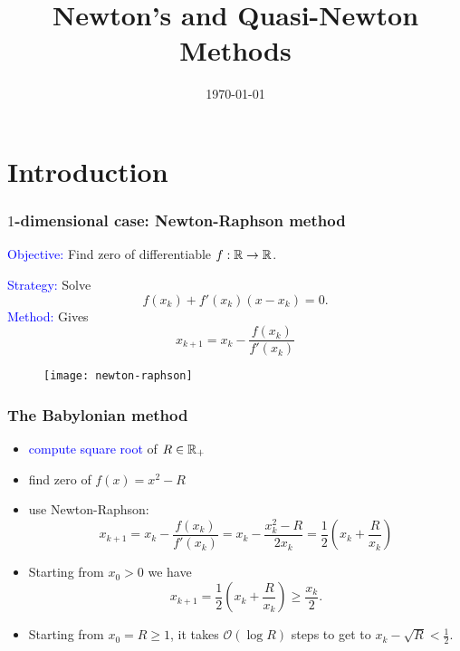 \documentclass{beamer}
\title{Newton's and Quasi-Newton Methods}
\date{\today}
\begin{document}
\maketitle
\frame{\tableofcontents[]}

\section{Introduction}

\begin{frame}
  \frametitle{$1$-dimensional case: Newton-Raphson method}
  \textcolor{blue}{Objective:} Find zero of differentiable $f: \mathbb{R} \to \mathbb{R}$.
  \vspace{0.3cm}
  \begin{minipage}{0.48\textwidth}
    \textcolor{blue}{Strategy:} Solve
    \begin{equation}
      f(x_k) + f'(x_k) (x - x_k) = 0.
    \end{equation}
    \textcolor{blue}{Method:} Gives
    \begin{equation}
      x_{k+1} = x_k - \frac{f(x_k)}{f'(x_k)}
    \end{equation}
  \end{minipage}
  \hfill
  \begin{minipage}{0.48\textwidth}
    \begin{figure}[ht]
      \centering
      \texttt{[image: newton-raphson]}
    \end{figure}
  \end{minipage}
\end{frame}

\begin{frame}
  \frametitle{The Babylonian method}
  \begin{itemize}
    \item \textcolor{blue}{compute square root} of $R \in \mathbb{R}_+$
    \item find zero of $f(x) = x^2 - R$
    \item use Newton-Raphson:
          \begin{equation}
            x_{k+1} = x_k - \frac{f(x_k)}{f'(x_k)} = x_k - \frac{x_k^2 - R}{2 x_k} = \frac12 \left( x_k + \frac{R}{x_k} \right)
          \end{equation}
    \item Starting from $x_0 > 0$ we have
          \begin{equation}
            x_{k+1} = \frac12 \left( x_k + \frac{R}{x_k} \right) \ge \frac{x_k}{2}.
          \end{equation}
    \item Starting from $x_0 = R \ge 1$, it takes $\mathcal{O}(\log R)$ steps to get to $x_k - \sqrt{R} < \frac12$.
  \end{itemize}
\end{frame}
\end{document}

